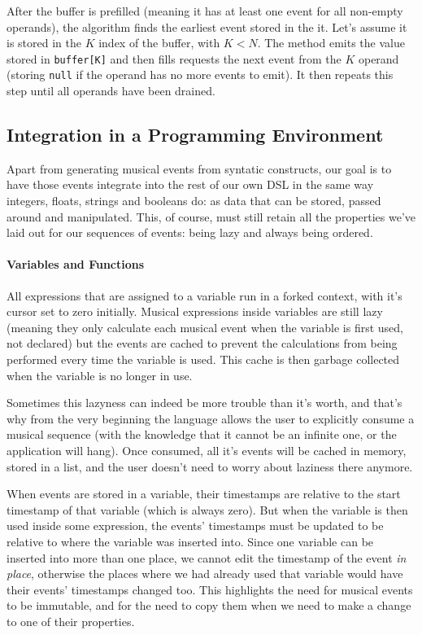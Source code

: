 \documentclass[a4paper,UKenglish,cleveref, autoref]{oasics-v2019}
\begin{document}
After the buffer is prefilled (meaning it has at least one event for all non-empty operands), the algorithm finds the earliest event stored in the it. Let's assume it is stored in the $K$ index of the buffer, with $K < N$. The method emits the value stored in \texttt{buffer[K]} and then fills requests the next event from the $K$ operand (storing \texttt{null} if the operand has no more events to emit). It then repeats this step until all operands have been drained.

\subsection{Integration in a Programming Environment}
Apart from generating musical events from syntatic constructs, our goal is to have those events integrate into the rest of our own DSL in the same way integers, floats, strings and booleans do: as data that can be stored, passed around and manipulated. This, of course, must still retain all the properties we've laid out for our sequences of events: being lazy and always being ordered.

\paragraph*{Variables and Functions}
All expressions that are assigned to a variable run in a forked context, with it's cursor set to zero initially. Musical expressions inside variables are still lazy (meaning they only calculate each musical event when the variable is first used, not declared) but the events are cached to prevent the calculations from being performed every time the variable is used. This cache is then garbage collected when the variable is no longer in use.

Sometimes this lazyness can indeed be more trouble than it's worth, and that's why from the very beginning the language allows the user to explicitly consume a musical sequence (with the knowledge that it cannot be an infinite one, or the application will hang). Once consumed, all it's  events will be cached in memory, stored in a list, and the user doesn't need to worry about laziness there anymore.

When events are stored in a variable, their timestamps are relative to the start timestamp of that variable (which is always zero). But when the variable is then used inside some expression, the events' timestamps must be updated to be relative to where the variable was inserted into. Since one variable can be inserted into more than one place, we cannot edit the timestamp of the event \textit{in place}, otherwise the places where we had already used that variable would have their events' timestamps changed too. This highlights the need for musical events to be immutable, and for the need to copy them when we need to make a change to one of their properties.
\end{document}
